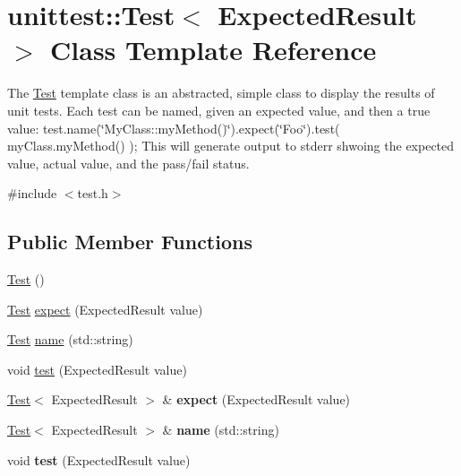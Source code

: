 \hypertarget{classunittest_1_1Test}{
\section{unittest::Test$<$ ExpectedResult $>$ Class Template Reference}
\label{classunittest_1_1Test}
}


The \hyperlink{classunittest_1_1Test}{Test} template class is an abstracted, simple class to display the results of unit tests. Each test can be named, given an expected value, and then a true value: test.name(\char`\"{}MyClass::myMethod()\char`\"{}).expect(\char`\"{}Foo\char`\"{}).test( myClass.myMethod() ); This will generate output to stderr shwoing the expected value, actual value, and the pass/fail status.  




{\ttfamily \#include $<$test.h$>$}

\subsection*{Public Member Functions}
\begin{DoxyCompactItemize}
\item 
\hyperlink{classunittest_1_1Test_ab0710bc26685edad9d465b9281c6cc9f}{Test} ()
\item 
\hyperlink{classunittest_1_1Test}{Test} \hyperlink{classunittest_1_1Test_a3d050190dab1a5a3180ba683814feaf5}{expect} (ExpectedResult value)
\item 
\hyperlink{classunittest_1_1Test}{Test} \hyperlink{classunittest_1_1Test_abffe1fce54d311766a4c177f6b0fa9cd}{name} (std::string)
\item 
void \hyperlink{classunittest_1_1Test_a68e6b4f7a18747533b9000640a8e0abb}{test} (ExpectedResult value)
\item 
\hypertarget{classunittest_1_1Test_afc6e0bcb4b8f44c09b4c6f3a0402a98a}{
\hyperlink{classunittest_1_1Test}{Test}$<$ ExpectedResult $>$ \& {\bfseries expect} (ExpectedResult value)}
\label{classunittest_1_1Test_afc6e0bcb4b8f44c09b4c6f3a0402a98a}

\item 
\hypertarget{classunittest_1_1Test_a403bc965292a355e1d0c997c15232e3e}{
\hyperlink{classunittest_1_1Test}{Test}$<$ ExpectedResult $>$ \& {\bfseries name} (std::string)}
\label{classunittest_1_1Test_a403bc965292a355e1d0c997c15232e3e}

\item 
\hypertarget{classunittest_1_1Test_a68e6b4f7a18747533b9000640a8e0abb}{
void {\bfseries test} (ExpectedResult value)}
\label{classunittest_1_1Test_a68e6b4f7a18747533b9000640a8e0abb}

\end{DoxyCompactItemize}

